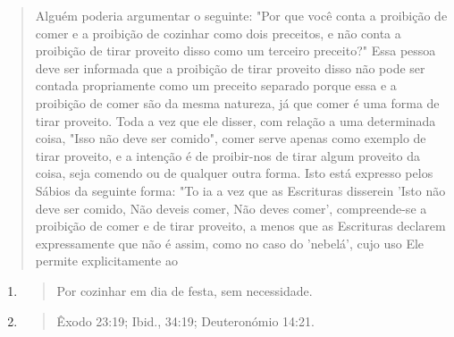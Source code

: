 \begin{quote}
Alguém poderia argumentar o seguinte: "Por que você conta a proi­bição
de comer e a proibição de cozinhar como dois preceitos, e não conta a
proibição de tirar proveito disso como um terceiro preceito?" Essa
pessoa deve ser informada que a proibição de tirar proveito disso não
pode ser con­tada propriamente como um preceito separado porque essa e a
proibição de comer são da mesma natureza, já que comer é uma forma de
tirar proveito. Toda a vez que ele disser, com relação a uma determinada
coisa, "Isso não deve ser comido", comer serve apenas como exemplo de
tirar proveito, e a intenção é de proibir-nos de tirar algum proveito da
coisa, seja comendo ou de qualquer outra forma. Isto está expresso pelos
Sábios da seguinte for­ma: "To ia a vez que as Escrituras disserein
'Isto não deve ser comido, Não deveis comer, Não deves comer',
compreende-se a proibição de comer e de tirar proveito, a menos que as
Escrituras declarem expressamente que não é assim, como no caso do
'nebelá', cujo uso Ele permite explicitamente ao
\end{quote}

\begin{enumerate}
\def\labelenumi{\arabic{enumi}.}
\setcounter{enumi}{355}
\item
  \begin{quote}
  Por cozinhar em dia de festa, sem necessidade.
  \end{quote}
\item
  \begin{quote}
  Êxodo 23:19; Ibid., 34:19; Deuteronómio 14:21.
  \end{quote}
\end{enumerate}

